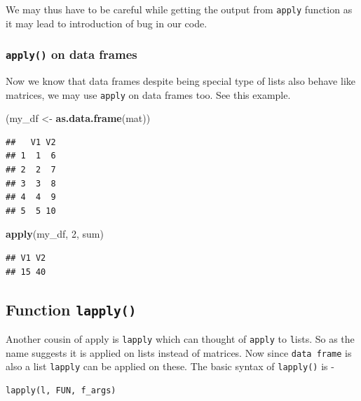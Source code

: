 \documentclass[
]{book}
\newenvironment{Shaded}{\begin{snugshade}}{\end{snugshade}}
\newcommand{\DecValTok}[1]{\textcolor[rgb]{0.00,0.00,0.81}{#1}}
\newcommand{\FunctionTok}[1]{\textcolor[rgb]{0.13,0.29,0.53}{\textbf{#1}}}
\newcommand{\NormalTok}[1]{#1}
\newcommand{\OtherTok}[1]{\textcolor[rgb]{0.56,0.35,0.01}{#1}}
\begin{document}
We may thus have to be careful while getting the output from \texttt{apply} function as it may lead to introduction of bug in our code.

\hypertarget{apply-on-data-frames}{%
\subsubsection*{\texorpdfstring{\texttt{apply()} on data frames}{apply() on data frames}}\label{apply-on-data-frames}}

Now we know that data frames despite being special type of lists also behave like matrices, we may use \texttt{apply} on data frames too. See this example.

\begin{Shaded}
\begin{Highlighting}[]
\NormalTok{(my\_df }\OtherTok{\textless{}{-}} \FunctionTok{as.data.frame}\NormalTok{(mat))}
\end{Highlighting}
\end{Shaded}

\begin{verbatim}
##   V1 V2
## 1  1  6
## 2  2  7
## 3  3  8
## 4  4  9
## 5  5 10
\end{verbatim}

\begin{Shaded}
\begin{Highlighting}[]
\FunctionTok{apply}\NormalTok{(my\_df, }\DecValTok{2}\NormalTok{, sum)}
\end{Highlighting}
\end{Shaded}

\begin{verbatim}
## V1 V2 
## 15 40
\end{verbatim}

\hypertarget{function-lapply}{%
\subsection{\texorpdfstring{Function \texttt{lapply()}}{Function lapply()}}\label{function-lapply}}

Another cousin of apply is \texttt{lapply} which can thought of \texttt{apply} to \texttt{l}ists. So as the name suggests it is applied on lists instead of matrices. Now since \texttt{data\ frame} is also a list \texttt{lapply} can be applied on these. The basic syntax of \texttt{lapply()} is -

\begin{verbatim}
lapply(l, FUN, f_args)
\end{verbatim}
\end{document}
